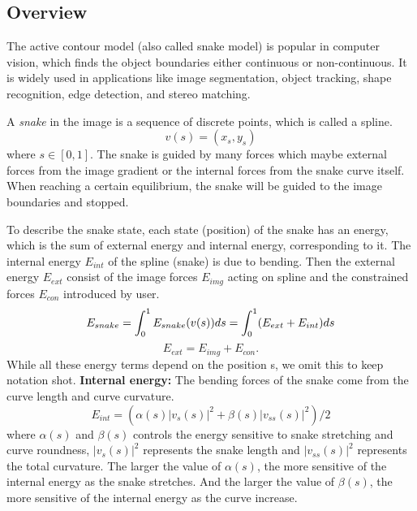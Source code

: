 \subsection{Overview}
The active contour model \cite{kass1988snakes} (also called snake model) is popular in computer vision, which finds the object boundaries either continuous or non-continuous. It is widely used in applications like image segmentation, object tracking, shape recognition, edge detection, and stereo matching.

A \emph{snake} in the image is a sequence of discrete points, which is called a spline.
\begin{equation}
v(s) = (x_s, y_s)
\end{equation}
where $s \in [0,1]$. The snake is guided by many forces which maybe external forces from the image gradient or the internal forces from the snake curve itself. When reaching a certain equilibrium, the snake will be guided to the image boundaries and stopped.

To describe the snake state, each state (position) of the snake has an energy, which is the sum of external energy and internal energy, corresponding to it. The internal energy $E_{int}$ of the spline (snake) is due to bending. Then the external energy $E_{ext}$ consist of the image forces $E_{img}$ acting on spline and the constrained forces $E_{con}$ introduced by user. 
\begin{equation}
E_{snake} = \int_0^1E_{snake}(v(s))ds = \int_0^1(E_{ext} + E_{int})ds \\
\end{equation}
\begin{equation}
E_{ext} = E_{img} + E_{con}.
\end{equation}
While all these energy terms depend on the position s, we omit this to keep notation shot.  
\textbf{Internal energy: } The bending forces of the snake come from the curve length and curve curvature.
\begin{equation}\label{eqn:int-energy}
E_{int} = (\alpha(s)|v_s(s)|^2 + \beta(s)|v_{ss}(s)|^2)/2
\end{equation}
where $\alpha(s)$ and $\beta(s)$ controls the energy sensitive to snake stretching and curve roundness, $|v_s(s)|^2$ represents the snake length and $|v_{ss}(s)|^2$ represents the total curvature. The larger the value of $\alpha(s)$, the more sensitive of the internal energy as the snake stretches. And the larger the value of $\beta(s)$, the more sensitive of the internal energy as the curve increase.

